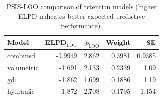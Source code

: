 \begin{table}
\caption{PSIS-LOO comparison of retention models (higher ELPD indicates better expected predictive performance).}
\label{tab:model_comparison}
\begin{tabular}{lrrrr}
\toprule
Model & ELPD$_{\mathrm{LOO}}$ & $p_{\mathrm{LOO}}$ & Weight & SE \\
\midrule
combined & -0.9949 & 2.862 & 0.3981 & 0.9385 \\
volumetric & -1.691 & 2.133 & 0.2339 & 1.09 \\
gdi & -1.862 & 1.699 & 0.1886 & 1.19 \\
hydraulic & -1.872 & 2.708 & 0.1795 & 1.154 \\
\bottomrule
\end{tabular}
\end{table}
